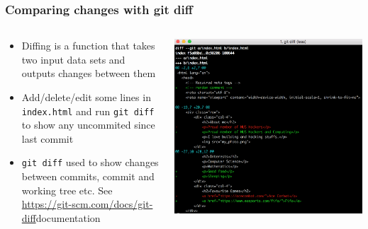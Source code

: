 \documentclass[12pt]{beamer}
\begin{document}
\begin{frame}
\frametitle{Comparing changes with git diff}
\begin{columns}
	\begin{column}{0.5\linewidth}
		\footnotesize
		\begin{itemize}
			\item Diffing is a function that takes two input data sets and outputs changes between them
			\item Add/delete/edit some lines in \texttt{index.html} and run \texttt{git diff} to show any uncommited since last commit
			\item \texttt{git diff} used to show changes between commits, commit and working tree etc. See \url{https://git-scm.com/docs/git-diff}{documentation}
		\end{itemize}		
	\end{column}
	\begin{column}{0.5\linewidth}
		\includegraphics[width=\linewidth]{git_diff_screenshot}
	\end{column}
\end{columns}
\end{frame}
\end{document}

